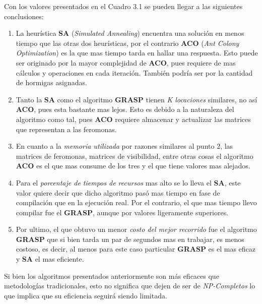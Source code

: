                \newline
                \newline
                Con los valores presentados en el Cuadro 3.1 se pueden llegar a las siguientes conclusiones:
                \begin{enumerate}
                    \item La heurística \textbf{SA} (\textit{Simulated Annealing}) encuentra una solución en menos tiempo que las otras dos heurísticas, por el contrario\textbf{ ACO} (\textit{Ant Colony Optimization}) es la que mas tiempo tarda en hallar una respuesta. Esto puede ser originado por la mayor complejidad de \textbf{ACO}, pues requiere de mas cálculos y operaciones en cada iteración. También podría ser por la cantidad de hormigas asignadas.
                    \item Tanto la \textbf{SA} como el algoritmo \textbf{GRASP} tienen \textit{K locaciones} similares, no así \textbf{ACO}, pues esta bastante mas lejos. Esto es debido a la naturaleza del algoritmo como tal, pues \textbf{ACO} requiere almacenar y actualizar las matrices que representan a las feromonas.
                    \item En cuanto a la \textit{memoria utilizada} por razones similares al punto 2, las matrices de feromonas, matrices de visibilidad, entre otras cosas el algoritmo \textbf{ACO} es el que mas consume de los tres y el que tiene valores mas alejados. 
                    \item Para el\textit{ porcentaje de tiempos de recursos} mas alto se lo lleva el \textbf{SA}, este valor quiere decir que dicho algoritmo pasó mas tiempo en fase de compilación  que en la ejecución real. Por el contrario, el que mas tiempo llevo compilar fue el \textbf{GRASP}, aunque por valores ligeramente superiores.
                    \item Por ultimo, el que obtuvo un menor \textit{costo del mejor recorrido} fue el algoritmo \textbf{GRASP} que si bien tarda un par de segundos mas en trabajar, es menos costoso, es decir, al menos para este caso particular \textbf{GRASP} es el mas eficaz y \textbf{SA} el mas eficiente.
                \end{enumerate}                      
                Si bien los algoritmos presentados anteriormente son más eficaces que metodologías tradicionales, esto no significa que dejen de ser de \textit{NP-Completos} lo que implica que su eficiencia seguirá siendo limitada.
